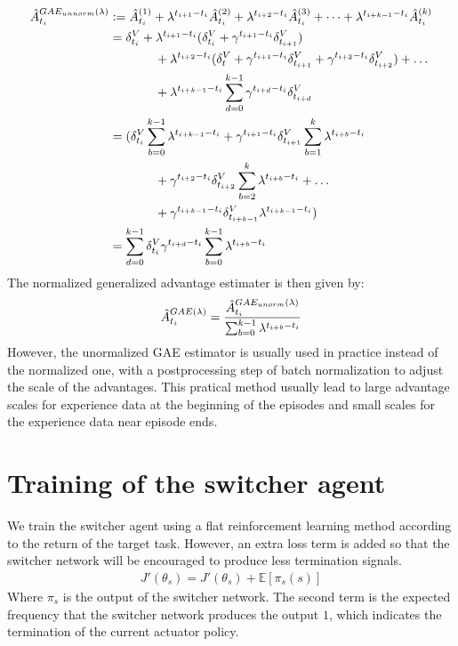 \begin{align}
\hat{A}_{t_i}^{GAE_{unnorm}(\lambda)}
&\vcentcolon=  \hat{A}_{t_i}^{(1)} + \lambda^{t_{i+1}-t_i}  \hat{A}_{t_i}^{(2)} + \lambda^{t_{i+2}-t_i} \hat{A}_{t_i}^{(3)} + \dots + \lambda^{t_{i+k-1}-t_i} \hat{A}_{t_i}^{(k)} \nonumber \\
&=  \delta^V_{t_i} 
+ \lambda^{t_{i+1}-t_i} (\delta^V_{t_i} + \gamma^{t_{i+1}-t_i} \delta^V_{t_{i+1}} ) \\
&\ \ \ \ \  \ \ \ \ \ \ +\lambda^{t_{i+2}-t_i} (\delta^V_t + \gamma^{t_{i+1}-t_i} \delta^V_{t_{i+1}} + \gamma^{t_{i+2}-t_i} \delta^V_{t_{i+2}}) + \dots \nonumber \\
&\ \ \ \ \  \ \ \ \ \ \ +\lambda^{t_{i+k-1}-t_i}  \sum_{d=0}^{k-1} \gamma^{t_{i+d}-t_i} \delta^V_{t_{i+d}}\\
&= (
\delta^V_{t_i}  \sum_{b=0}^{k-1} \lambda^{t_{i+k-1}-t_i}
+\gamma^{t_{i+1}-t_i} \delta^V_{t_{i+1}} \sum_{b=1}^k \lambda^{t_{i+b}-t_i} \nonumber \\
&\ \ \ \ \  \ \ \ \ \ \ +\gamma^{t_{i+2}-t_i} \delta^V_{t_{i+2}} \sum_{b=2}^k \lambda^{t_{i+b}-t_i}
+\dots \\
&\ \ \ \ \  \ \ \ \ \ \ +\gamma^{t_{i+k-1}-t_i} \delta^V_{t_{i+k-1}} \lambda^{t_{i+k-1}-t_i})
\nonumber \\
&= \sum_{d=0}^{k-1} \delta^V_{t_i} \gamma^{t_{i+d}-t_i} \sum_{b=0}^{k-1} \lambda^{t_{i+b}-t_i}
\label{eq:gaelam1}
\end{align}
The normalized generalized advantage estimater is then given by:
\begin{align}
\hat{A}_{t_i}^{GAE(\lambda)}
= \frac{\hat{A}_{t_i}^{GAE_{unorm}(\lambda)}}{\sum_{b=0}^{k-1} \lambda^{t_{i+b}-t_i}}
\end{align}
However, the unormalized GAE estimator is usually used in practice instead of the normalized one, with a postprocessing step of batch normalization to adjust the scale of the advantages. This pratical method usually lead to large advantage scales for experience data at the beginning of the episodes and small scales for the experience data near episode ends.

\section{Training of the switcher agent}
We train the switcher agent using a flat reinforcement learning method according to the return of the target task. However, an extra loss term is added so that the switcher network will be encouraged to produce less termination signals.
\begin{align}
J'(\theta_s) = J'(\theta_s) + \mathbb{E}[\pi_s(s)]
\end{align}
Where $\pi_s$ is the output of the switcher network. The second term is the expected frequency that the switcher network produces the output $1$, which indicates the termination of the current actuator policy.

